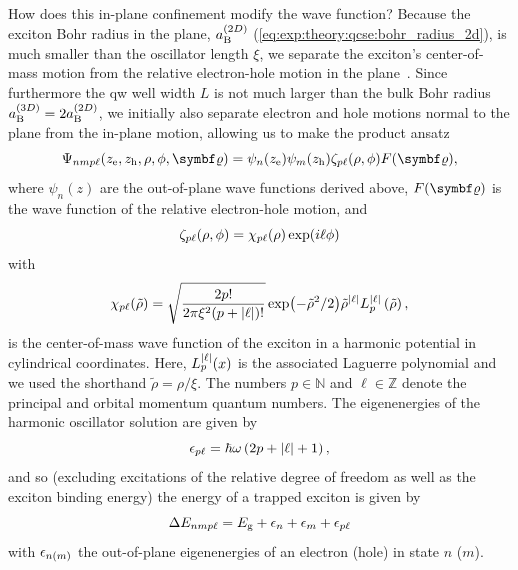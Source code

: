 How does this in-plane confinement modify the wave function?
Because the exciton Bohr radius in the plane, $a_{\mathrm{B}}^{(2D)}$ (\cref{eq:exp:theory:qcse:bohr_radius_2d}), is much smaller than the oscillator length $\xi$, we separate the exciton's center-of-mass motion from the relative electron-hole motion in the plane~\cite{Kavokin1994}.
Since furthermore the \gls{qw} well width $L$ is not much larger than the bulk Bohr radius $a_{\mathrm{B}}^{(3D)}=2a_{\mathrm{B}}^{(2D)}$, we initially also separate electron and hole motions normal to the plane from the in-plane motion, allowing us to make the product ansatz
\begin{equation}\label{eq:exp:theory:qcse:trap:psi:tot}
    \Psi_{nmp\ell}(z_{\mr{e}},z_{\mr{h}},\rho,\phi,\bvec{\varrho}) = \psi_n(z_{\mr{e}})\psi_m(z_{\mr{h}})\zeta_{p\ell}(\rho,\phi) F(\bvec{\varrho}),
\end{equation}
where $\psi_n(z)$ are the out-of-plane wave functions derived above, $F(\bvec{\varrho})$ is the wave function of the relative electron-hole motion, and
\begin{equation}\label{eq:exp:theory:qcse:trap:psi:COM}
    \zeta_{p\ell}(\rho,\phi) = \chi_{p\ell}(\rho)\exp(i\ell\phi)
\end{equation}
with~\cite{Karimi2014}
\begin{equation}\label{eq:exp:theory:qcse:trap:psi:radial}
    \chi_{p\ell}(\tilde{\rho}) = \sqrt{\frac{2p!}{2\pi\xi^2(p + \abs{\ell})!}}\exp(-\tilde{\rho}^2/2)\tilde{\rho}^{\abs{\ell}}L_p^{\abs{\ell}}\left(\tilde{\rho}\right),
\end{equation}
is the center-of-mass wave function of the exciton in a harmonic potential in cylindrical coordinates.
Here, $L_p^{\abs{\ell}}(x)$ is the associated Laguerre polynomial and we used the shorthand $\tilde{\rho} = \rho/\xi$.
The numbers $p\in\mathbb{N}$ and $\ell\in\mathbb{Z}$ denote the principal and orbital momentum quantum numbers.
The eigenenergies of the harmonic oscillator solution are given by
\begin{equation}\label{eq:exp:theory:qcse:trap:ho:eps}
    \epsilon_{p\ell} = \hbar\omega\left(2p + \abs{\ell} + 1\right),
\end{equation}
and so (excluding excitations of the relative degree of freedom as well as the exciton binding energy) the energy of a trapped exciton is given by
\begin{equation}
    \Delta E_{nmp\ell} = E_{\mathrm{g}} + \epsilon_n + \epsilon_m + \epsilon_{p\ell}
\end{equation}
with $\epsilon_{n(m)}$ the out-of-plane eigenenergies of an electron (hole) in state $n$ ($m$).

